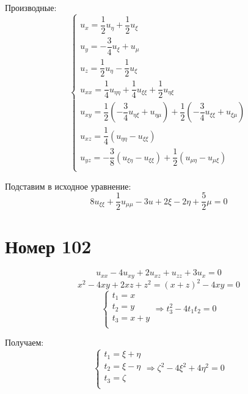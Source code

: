 Производные:
$$ \begin{cases}
        u_x = \dfrac{1}{2} u_\eta + \dfrac{1}{2} u_\xi                                                                                                  \\
        u_y = -\dfrac{3}{4} u_\xi + u_\mu                                                                                                               \\
        u_z = \dfrac{1}{2} u_\eta - \dfrac{1}{2} u_\xi                                                                                                  \\
        u_{xx} = \dfrac{1}{4} u_{\eta \eta} + \dfrac{1}{4} u_{\xi \xi} + \dfrac{1}{2} u_{\eta \xi}                                                      \\
        u_{xy} = \dfrac{1}{2}\left(-\dfrac{3}{4} u_{\eta \xi} + u_{\eta \mu}\right) + \dfrac{1}{2} \left(-\dfrac{3}{4} u_{\xi \xi} + u_{\xi \mu}\right) \\
        u_{xz} = \dfrac{1}{4} (u_{\eta \eta} - u_{\xi \xi})                                                                                             \\
        u_{yz} = -\dfrac{3}{8} (u_{\xi \eta} - u_{\xi \xi}) + \dfrac{1}{2} (u_{\mu \eta} - u_{\mu \xi})                                                 \\
    \end{cases} $$

Подставим в исходное уравнение:
$$ 8u_{\xi \xi} + \dfrac{1}{2} u_{\mu \mu} - 3u + 2 \xi - 2 \eta + \dfrac{5}{2} \mu = 0 $$

\section*{Номер 102}
$$ u_{xx} - 4u_{xy} + 2u_{xz} + u_{zz} + 3u_x = 0 $$
$$ x^2 - 4xy + 2xz + z^2 = (x + z)^2 - 4xy = 0 $$
$$ \begin{cases}
    t_1 = x  \\
    t_2 = y \\
    t_3 = x + y \\
\end{cases} \Rightarrow t_3^2 - 4t_1 t_2 = 0$$

Получаем:
$$ \begin{cases}
    t_1 = \xi + \eta \\
    t_2 = \xi - \eta \\
    t_3 = \zeta \\
\end{cases} \Rightarrow \zeta^2 - 4\xi^2 + 4 \eta^2 = 0$$















